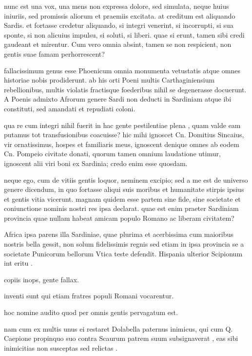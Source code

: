  nunc est una vox, una mens non expressa dolore, sed simulata, neque huius iniuriis, sed promissis aliorum et praemiis excitata. at creditum est aliquando Sardis. et fortasse credetur aliquando, si integri venerint, si incorrupti, si sua sponte, si non alicuius impulsu, si soluti, si liberi. quae si erunt, tamen sibi credi gaudeant et mirentur. Cum vero omnia absint, tamen se non respicient, non gentis suae famam perhorrescent?

 fallacissimum genus esse Phoenicum omnia monumenta vetustatis atque omnes historiae nobis prodiderunt. ab his orti Poeni multis Carthaginiensium rebellionibus, multis violatis fractisque foederibus nihil se degenerasse docuerunt. A Poenis admixto Afrorum genere Sardi non deducti in Sardiniam atque ibi constituti, sed amandati et repudiati coloni.

 qua re cum integri nihil fuerit in hac gente pestilentiae plena , quam valde eam putamus tot transfusionibus coacuisse? hic mihi ignoscet Cn. Domitius Sincaius, vir ornatissimus, hospes et familiaris meus, ignoscent denique omnes ab eodem Cn. Pompeio civitate donati, quorum tamen omnium laudatione utimur, ignoscent alii viri boni ex Sardinia; credo enim esse quosdam.

 neque ego, cum de vitiis gentis loquor, neminem excipio; sed a me est de universo genere dicendum, in quo fortasse aliqui suis moribus et humanitate stirpis ipsius et gentis vitia vicerunt. magnam quidem esse partem sine fide, sine societate et coniunctione nominis nostri res ipsa declarat. quae est enim praeter Sardiniam provincia quae nullam habeat amicam populo Romano ac liberam civitatem?

 Africa ipsa parens illa Sardiniae, quae plurima et acerbissima cum maioribus nostris bella gessit, non solum fidelissimis regnis sed etiam in ipsa provincia se a societate Punicorum bellorum Vtica teste defendit. Hispania ulterior Scipionum int eritu .

 copiis inops, gente fallax.

 inventi sunt qui etiam fratres populi Romani vocarentur.

 hoc nomine audito quod per omnis gentis pervagatum est.

 nam cum ex multis unus ei restaret Dolabella paternus inimicus, qui cum Q. Caepione propinquo suo contra Scaurum patrem suum subsignaverat , eas sibi inimicitias non susceptas sed relictas .

